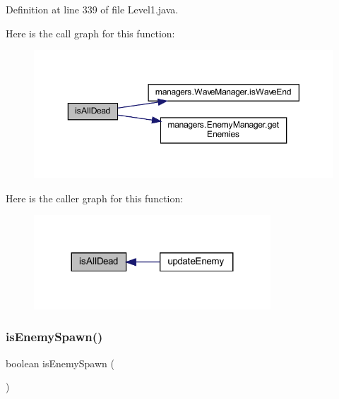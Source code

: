Definition at line 339 of file Level1.\+java.

Here is the call graph for this function\+:
\nopagebreak
\begin{figure}[H]
\begin{center}
\leavevmode
\includegraphics[width=350pt]{classscenes_1_1_level1_acd1846d50c3d8678777f9ab6716f5cf3_cgraph}
\end{center}
\end{figure}
Here is the caller graph for this function\+:\nopagebreak
\begin{figure}[H]
\begin{center}
\leavevmode
\includegraphics[width=251pt]{classscenes_1_1_level1_acd1846d50c3d8678777f9ab6716f5cf3_icgraph}
\end{center}
\end{figure}
\mbox{\label{classscenes_1_1_level1_a121827ebd1c5b24c92f966721b51c0b9}} 
\subsubsection{\texorpdfstring{is\+Enemy\+Spawn()}{isEnemySpawn()}}
{\footnotesize\ttfamily boolean is\+Enemy\+Spawn (\begin{DoxyParamCaption}{ }\end{DoxyParamCaption})\hspace{0.3cm}{\ttfamily [private]}}



